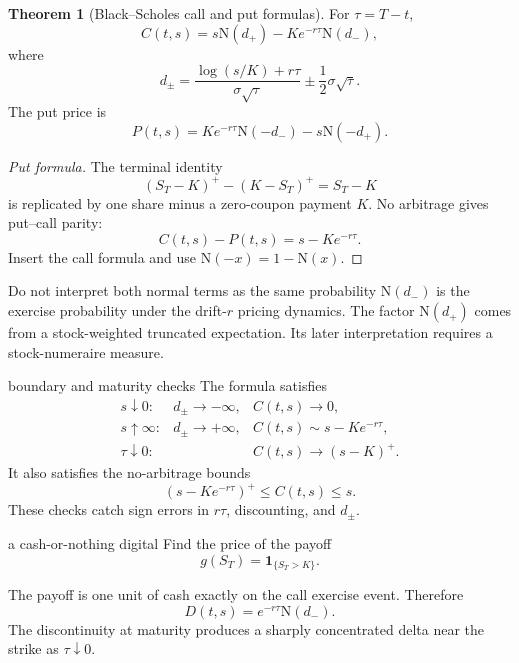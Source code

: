 \documentclass[10pt]{article}
\newcommand{\1}{\mathbf 1}
\newcommand{\Ncdf}{\mathrm N}
\theoremstyle{definition}
\newtheorem{theorem}[definition]{Theorem}
\begin{document}
\begin{theorem}[Black--Scholes call and put formulas]
For \(\tau=T-t\),
\[
\boxed{
C(t,s)
=s\Ncdf(d_+)-Ke^{-r\tau}\Ncdf(d_-),}
\]
where
\[
\boxed{
d_\pm
=\frac{\log(s/K)+r\tau}{\sigma\sqrt{\tau}}
\pm\frac12\sigma\sqrt{\tau}.}
\]
The put price is
\[
\boxed{
P(t,s)
=Ke^{-r\tau}\Ncdf(-d_-)-s\Ncdf(-d_+).}
\]
\end{theorem}

\begin{proof}[Put formula]
The terminal identity
\[
(S_T-K)^+-(K-S_T)^+=S_T-K
\]
is replicated by one share minus a zero-coupon payment \(K\). No arbitrage
gives put--call parity:
\[
C(t,s)-P(t,s)=s-Ke^{-r\tau}.
\]
Insert the call formula and use
\(\Ncdf(-x)=1-\Ncdf(x)\).
\end{proof}

\begin{warningbox}{Do not interpret both normal terms as the same probability}
\(\Ncdf(d_-)\) is the exercise probability under the drift-\(r\) pricing
dynamics. The factor \(\Ncdf(d_+)\) comes from a stock-weighted truncated
expectation. Its later interpretation requires a stock-numeraire measure.
\end{warningbox}

\begin{boardexample}{boundary and maturity checks}
The formula satisfies
\[
\begin{array}{lll}
s\downarrow0: & d_\pm\to-\infty, & C(t,s)\to0,\\
s\uparrow\infty: & d_\pm\to+\infty, & C(t,s)\sim s-Ke^{-r\tau},\\
\tau\downarrow0: & & C(t,s)\to(s-K)^+.
\end{array}
\]
It also satisfies the no-arbitrage bounds
\[
(s-Ke^{-r\tau})^+\leq C(t,s)\leq s.
\]
These checks catch sign errors in \(r\tau\), discounting, and \(d_\pm\).
\end{boardexample}

\begin{studentexercise}{a cash-or-nothing digital}
Find the price of the payoff
\[
g(S_T)=\1_{\{S_T>K\}}.
\]
\end{studentexercise}
\begin{shortsolution}
The payoff is one unit of cash exactly on the call exercise event. Therefore
\[
\boxed{
D(t,s)=e^{-r\tau}\Ncdf(d_-).}
\]
The discontinuity at maturity produces a sharply concentrated delta near
the strike as \(\tau\downarrow0\).
\end{shortsolution}
\end{document}
